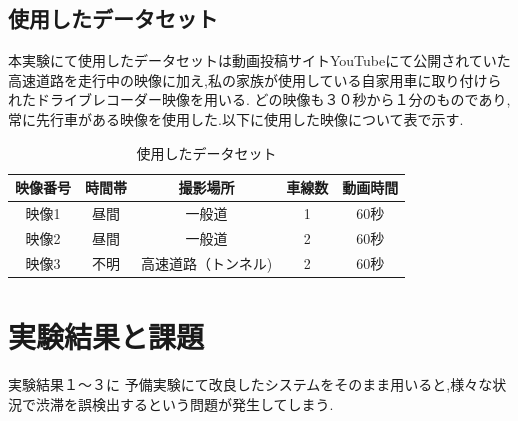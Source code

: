 \subsection{使用したデータセット}
本実験にて使用したデータセットは動画投稿サイトYouTubeにて公開されていた高速道路を走行中の映像に加え,私の家族が使用している自家用車に取り付けられたドライブレコーダー映像を用いる.
どの映像も３０秒から１分のものであり,常に先行車がある映像を使用した.以下に使用した映像について表で示す.

\begin{table}[htbp]
  \centering
  \begin{scriptsize}
  \begin{tabular}{ccccc}
  \toprule
映像番号 & 時間帯 & 撮影場所 & 車線数 & 動画時間\\
  \midrule
映像1 & 昼間 & 一般道 & 1 & 60秒\\
映像2 & 昼間 & 一般道 & 2 & 60秒\\
映像3 & 不明 & 高速道路（トンネル) & 2 & 60秒 \\
  \bottomrule
  \end{tabular}
  \end{scriptsize}
  \caption{使用したデータセット}
  \label{tab:dataset}
\end{table}

\section{実験結果と課題}
実験結果１〜３に
予備実験にて改良したシステムをそのまま用いると,様々な状況で渋滞を誤検出するという問題が発生してしまう.

